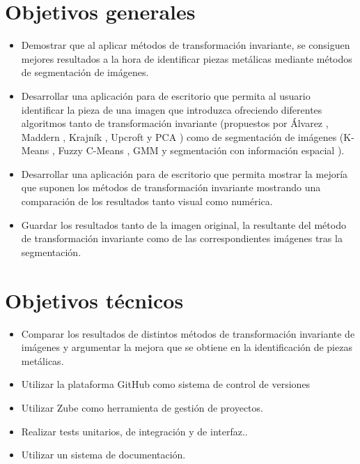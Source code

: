 

\section{Objetivos generales}\label{objetivos-generales}

\begin{itemize}
    \tightlist
        \item
            Demostrar que al aplicar métodos de transformación invariante, se consiguen mejores resultados a la hora de identificar piezas metálicas mediante métodos de segmentación de imágenes.
        \item
            Desarrollar una aplicación para de escritorio que permita al usuario identificar la pieza de una imagen que introduzca ofreciendo diferentes algoritmos tanto de transformación invariante (propuestos por Álvarez \cite{alvarez2011}, Maddern \cite{maddern2014}, Krajník \cite{krajník2015}, Upcroft \cite{upcroft2014} y PCA \cite{pca2017}) como de segmentación de imágenes (K-Means \cite{MATLAB:2023bKmeans}, Fuzzy C-Means \cite{MATLAB:2023bFuzzy}, GMM \cite{MATLAB:2023bGMM} y segmentación con información espacial \cite{wang2012hmrf}).
        \item
            Desarrollar una aplicación para de escritorio que permita mostrar la mejoría que suponen los métodos de transformación invariante mostrando una comparación de los resultados tanto visual como numérica.
        \item
            Guardar los resultados tanto de la imagen original, la resultante del método de transformación invariante como de las correspondientes imágenes tras la segmentación.
\end{itemize}

\section{Objetivos técnicos}\label{objetivos-tecnicos}

\begin{itemize}
    \tightlist
        \item
            Comparar los resultados de distintos métodos de transformación invariante de imágenes y argumentar la mejora que se obtiene en la identificación de piezas metálicas.
        \item
            Utilizar la plataforma GitHub como sistema de control de versiones
        \item
            Utilizar Zube como herramienta de gestión de proyectos.
        \item
            Realizar tests unitarios, de integración y de interfaz..
        \item
            Utilizar un sistema de documentación.
\end{itemize}

